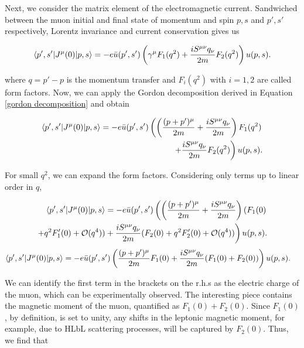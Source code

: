 \documentclass{article}
\numberwithin{equation}{section} %
\begin{document}
Next, we consider the matrix element of the electromagnetic current. Sandwiched between the muon initial and final state of momentum and spin $p,s$ and $p',s'$ respectively, Lorentz invariance and current conservation gives us

\begin{equation}
\mathinner{\langle{p',s'|J^\mu(0)|p,s}\rangle} = -e\bar{u}(p',s')\left( \gamma^\mu F_1(q^2) + \frac{iS^{\mu\nu}q_\nu}{2m}F_2(q^2) \right)u(p,s).
\end{equation}

\noindent where $q = p'-p$ is the momentum transfer and $F_i(q^2)$ with $i=1,2$ are called form factors. Now, we can apply the Gordon decomposition derived in Equation \ref{gordon decomposition} and obtain

\begin{equation}
\begin{split}
\mathinner{\langle{p',s'|J^\mu(0)|p,s}\rangle} = -e\bar{u}(p',s')\left( \left( \frac{(p+p')^\mu }{2m} + \frac{iS^{\mu\nu}q_\nu}{2m} \right) F_1(q^2)\right.&\\
\left. + \frac{iS^{\mu\nu}q_\nu}{2m}F_2(q^2) \right)u(p,s).&
\end{split}
\label{em current}
\end{equation}

For small $q^2$, we can expand the form factors. Considering only terms up to linear order in $q$,

\begin{equation}
\begin{split}
\mathinner{\langle{p',s'|J^\mu(0)|p,s}\rangle} = -e\bar{u}(p',s')\left( \left( \frac{(p+p')^\mu }{2m} + \frac{iS^{\mu\nu}q_\nu}{2m} \right) (F_1(0) \right.&\\
\left.  + q^2F'_1(0) + \mathcal{O}(q^4)) + \frac{iS^{\mu\nu}q_\nu}{2m}(F_2(0) + q^2F'_2(0) + \mathcal{O}(q^4)) \right)u(p,s).&
\end{split}
\end{equation}
\begin{equation}
\begin{split}
\mathinner{\langle{p',s'|J^\mu(0)|p,s}\rangle} = -e\bar{u}(p',s')\left( \frac{(p+p')^\mu }{2m} F_1(0) + \frac{iS^{\mu\nu}q_\nu}{2m}(F_1(0)+F_2(0)) \right)u(p,s).&
\end{split}
\label{em current with amu encoded}
\end{equation}

We can identify the first term in the brackets on the r.h.s as the electric charge\cite{zee} of the muon, which can be experimentally observed. The interesting piece contains the magnetic moment of the muon, quantified as $F_1(0) + F_2(0)$. Since $F_1(0)$, by definition, is set to unity, any shifts in the leptonic magnetic moment, for example, due to HLbL scattering processes, will be captured by $F_2(0)$. Thus, we find that \cite{blum}
\end{document}
